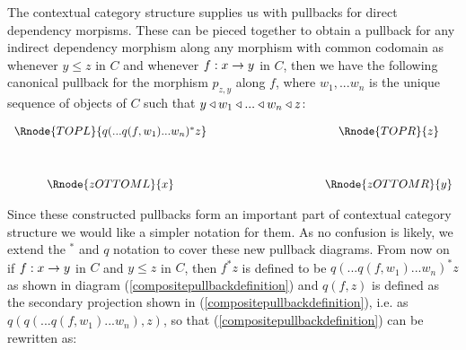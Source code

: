 The contextual category structure supplies us with pullbacks for direct dependency morpisms.
These can be pieced together to obtain  a pullback for any indirect dependency morphism   along any morphism with common codomain
as  whenever $y \leq z$ in $C$ and whenever $f:x \rightarrow y$ in $C$, then we have
the following canonical pullback for the morphism $p_{z, y}$ along $f$, where
$w_1, ... w_n$ is the unique sequence of objects of $C$ such that 
$y \triangleleft w_1 \triangleleft ... \triangleleft w_n \triangleleft z$:

\vspace{3mm}
\begin{center}
\begin{equation}
\label{compositepullbackdefinition}
\begin{array}{cp{2.9cm}c}
\Rnode{TOPL}{q(...q(f, w_1)...w_n)^* z} & & \Rnode{TOPR}{z}\\ [1.2cm]
\Rnode{zOTTOML}{x}         & & \Rnode{zOTTOMR}{y}
\end{array}
\end{equation}
\end{center}

Since these constructed pullbacks form an important part of contextual
category structure we would like a simpler notation for them. As no confusion is
likely, we extend the $^*$ and $q$ notation to cover these new pullback diagrams.
From now on if $f:x \rightarrow y$ in $C$ and $y \leq z$ in $C$, then $f^*z$ 
is defined to be $q(...q(f, w_1)...w_n)^* z$ as shown in diagram (\ref{compositepullbackdefinition}) 
and $q(f,z)$ is defined as the secondary projection shown in (\ref{compositepullbackdefinition}), i.e. as 
$q(q(...q(f,w_1)...w_n),z)$,
so that (\ref{compositepullbackdefinition}) can be rewritten as:

